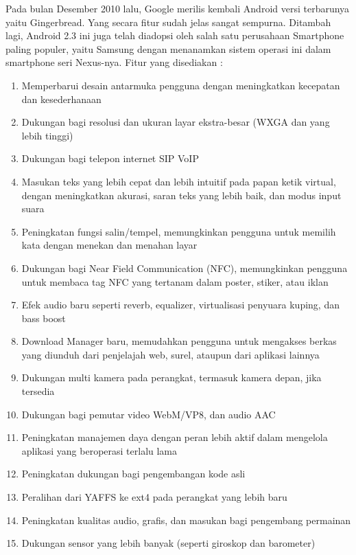 \begin{enumerate}
Pada bulan Desember 2010 lalu, Google merilis kembali Android versi terbarunya yaitu Gingerbread. Yang secara fitur sudah jelas sangat sempurna. Ditambah lagi, Android 2.3 ini juga telah diadopsi oleh salah satu perusahaan Smartphone paling populer, yaitu Samsung dengan menanamkan sistem operasi ini dalam smartphone seri Nexus-nya. Fitur yang disediakan :
\begin{enumerate} 
    \item Memperbarui desain antarmuka pengguna dengan meningkatkan kecepatan dan kesederhanaan
    \item Dukungan bagi resolusi dan ukuran layar ekstra-besar (WXGA dan yang lebih tinggi)
    \item Dukungan bagi telepon internet SIP VoIP
    \item Masukan teks yang lebih cepat dan lebih intuitif pada papan ketik virtual, dengan meningkatkan akurasi, saran teks yang lebih baik, dan modus input suara
    \item Peningkatan fungsi salin/tempel, memungkinkan pengguna untuk memilih kata dengan menekan dan menahan layar
    \item Dukungan bagi Near Field Communication (NFC), memungkinkan pengguna untuk membaca tag NFC yang tertanam dalam poster, stiker, atau iklan
    \item Efek audio baru seperti reverb, equalizer, virtualisasi penyuara kuping, dan bass boost
    \item Download Manager baru, memudahkan pengguna untuk mengakses berkas yang diunduh dari penjelajah web, surel, ataupun dari aplikasi lainnya
    \item Dukungan multi kamera pada perangkat, termasuk kamera depan, jika tersedia
    \item Dukungan bagi pemutar video WebM/VP8, dan audio AAC
    \item Peningkatan manajemen daya dengan peran lebih aktif dalam mengelola aplikasi yang beroperasi terlalu lama
    \item Peningkatan dukungan bagi pengembangan kode asli
    \item Peralihan dari YAFFS ke ext4 pada perangkat yang lebih baru
    \item Peningkatan kualitas audio, grafis, dan masukan bagi pengembang permainan
    \item Dukungan sensor yang lebih banyak (seperti giroskop dan barometer)
\end{enumerate}


\end{enumerate}
